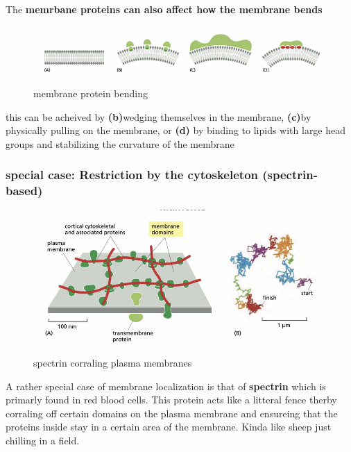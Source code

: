 \documentclass[../main.tex]{subfiles}
\begin{document}
The\textbf{ memrbane proteins can also affect how the membrane bends}

\begin{figure}[H]
    \centering
    \includegraphics[width=\linewidth]{bending.png}
    \caption{membrane protein bending}
    \label{fig:enter-label}
\end{figure}
this can be acheived by  \textbf{(b)}wedging themselves in the membrane, \textbf{(c)}by physically pulling on the membrane, or \textbf{(d)} by binding to lipids with large head groups and stabilizing the curvature of the membrane 


\subsubsection{special case: Restriction by the cytoskeleton (spectrin- based)}

\begin{figure}[H]
    \centering
    \includegraphics[width=\linewidth]{spectrin.png}
    \caption{\gls{spectrin} corraling plasma membranes}
    \label{fig:enter-label}
\end{figure}

A rather special case of membrane localization is that of\textbf{ spectrin} which is primarly found in red blood cells. This protein acts like a litteral fence therby corraling off certain domains on the plasma membrane and ensureing that the proteins inside stay in a certain area of the membrane. Kinda like sheep just chilling in a field.
\end{document}
